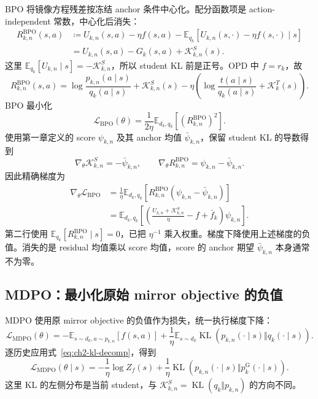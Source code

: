 \documentclass[lang=cn,scheme=chinese,openany]{../book/elegantbook}
\begin{document}
BPO 将镜像方程残差按冻结 anchor 条件中心化。配分函数项是 action-independent 常数，中心化后消失：
\begin{align}
R_{k,n}^{\mathrm{BPO}}(s,a)
&\coloneqq U_{k,n}(s,a)-\eta f(s,a)
-\mathbb E_{ q_k}[U_{k,n}(s,\cdot)-\eta f(s,\cdot)\mid s]
\label{eq:ch2-bpo-from-optimality}\\
&=U_{k,n}(s,a)-G_k(s,a)+\mathcal K_{k,n}^{S}(s).
\label{eq:ch2-bpo-expanded}
\end{align}
这里 $\mathbb E_{ q_k}[U_{k,n}\mid s]=-\mathcal K_{k,n}^{S}$，所以 student KL 前是正号。OPD 中 $f=r_k$，故
\begin{equation}
R_{k,n}^{\mathrm{BPO}}(s,a)
=\log\frac{ p_{k,n}(a\mid s)}{ q_k(a\mid s)}+\mathcal K_{k,n}^{S}(s)
-\eta\left(\log\frac{ t(a\mid s)}{ q_k(a\mid s)}+\mathcal K_k^{T}(s)\right).
\label{eq:ch2-bpo-opd-expanded}
\end{equation}
BPO 最小化
\begin{equation}
\mathcal L_{\mathrm{BPO}}(\theta)
=\frac1{2\eta}\mathbb E_{d_k, q_k}[(R_{k,n}^{\mathrm{BPO}})^2].
\label{eq:ch2-bpo-loss-bridge}
\end{equation}
使用第一章定义的 score $\psi_{k,n}$ 及其 anchor 均值 $\bar\psi_{k,n}$，保留 student KL 的导数得到
\begin{equation*}
\nabla_\theta\mathcal K_{k,n}^{S}=-\bar\psi_{k,n},\qquad
\nabla_\theta R_{k,n}^{\mathrm{BPO}}=\psi_{k,n}-\bar\psi_{k,n}.
\end{equation*}
因此精确梯度为
\begin{align}
\nabla_\theta\mathcal L_{\mathrm{BPO}}
&=\frac1\eta\mathbb E_{d_k, q_k}[R_{k,n}^{\mathrm{BPO}}(\psi_{k,n}-\bar\psi_{k,n})]
\label{eq:ch2-bpo-gradient-bridge}\\
&=\mathbb E_{d_k, q_k}\left[
\left(\frac{U_{k,n}+\mathcal K_{k,n}^{S}}\eta-f+\bar f_k\right)\psi_{k,n}\right].
\end{align}
第二行使用 $\mathbb E_{ q_k}[R_{k,n}^{\mathrm{BPO}}\mid s]=0$，已把 $\eta^{-1}$ 乘入权重。梯度下降使用上述梯度的负值。消失的是 residual 均值乘以 score 均值，score 的 anchor 期望 $\bar\psi_{k,n}$ 本身通常不为零。

\subsection{MDPO：最小化原始 mirror objective 的负值}
\label{subsec:ch2-mdpo-loss-derivation}

MDPO 使用原 mirror objective 的负值作为损失，统一执行梯度下降：
\begin{equation}
\mathcal L_{\mathrm{MDPO}}(\theta)
=-\mathbb E_{s\sim d_k,a\sim p_{k,n}}[f(s,a)]
+\frac1\eta\mathbb E_{s\sim d_k}\operatorname{KL}( p_{k,n}(\cdot\mid s)\Vert q_k(\cdot\mid s)).
\label{eq:ch2-mdpo-objective-bridge}
\end{equation}
逐历史应用式~\eqref{eq:ch2-kl-decomp}，得到
\begin{equation}
\mathcal L_{\mathrm{MDPO}}(\theta\mid s)
=-\frac1\eta\log Z_f(s)
+\frac1\eta\operatorname{KL}( p_{k,n}(\cdot\mid s)\Vert p_k^{\mathrm G}(\cdot\mid s)).
\label{eq:ch2-mdpo-kl-gap}
\end{equation}
这里 KL 的左侧分布是当前 student，与 $\mathcal K_{k,n}^{S}=\operatorname{KL}( q_k\Vert p_{k,n})$ 的方向不同。
\end{document}
